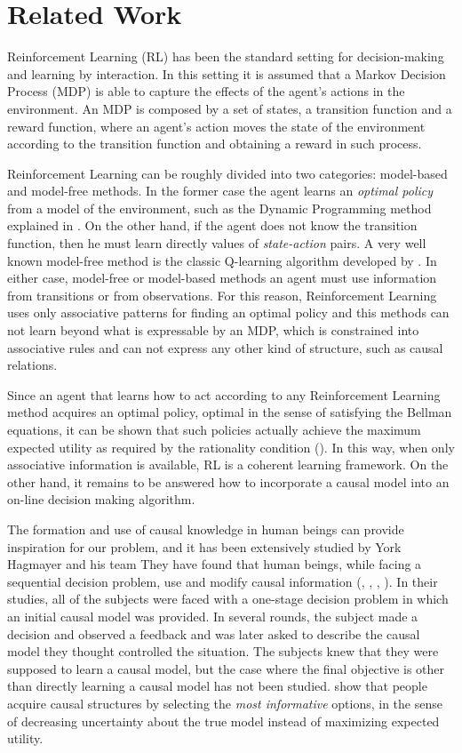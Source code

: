 \documentclass[english,letterpaper,12pt,final]{article}
\theoremstyle{definition}
\begin{document}
\section{Related Work}{\label{Related_Work}}
Reinforcement Learning (RL) has been the standard setting for decision-making and learning by interaction. In this setting it is assumed that a Markov Decision Process (MDP) is able to capture the effects of the agent's actions in the environment. An MDP is composed by a set of states, a transition function and a reward function, where an agent's action moves the state of the environment according to the transition function and obtaining a reward in such process.

Reinforcement Learning can be roughly divided into two categories: model-based and model-free methods. In the former case the agent learns an \textit{optimal policy} from a model of the environment, such as the Dynamic Programming method explained in \cite{sutton1998reinforcement}. On the other hand, if the agent does not know the transition function, then he must learn directly values of \textit{state-action} pairs. A very well known model-free method is the classic Q-learning algorithm developed by \cite{watkins1992q}. In either case, model-free or model-based methods an agent must use information from transitions or from observations. For this reason, Reinforcement Learning uses only associative patterns for finding an optimal policy and this methods can not learn beyond what is expressable by an MDP, which is constrained into associative rules and can not express any other kind of structure, such as causal relations. 

Since an agent that learns how to act according to any Reinforcement Learning method acquires an optimal policy, optimal in the sense of satisfying the Bellman equations, it can be shown that such policies actually achieve the maximum expected utility as required by the rationality condition (\cite{webb2007game}). In this way, when only associative information is available, RL is a coherent learning framework. On the other hand, it remains to be answered how to incorporate a causal model into an on-line decision making algorithm.

The formation and use of causal knowledge in human beings can provide inspiration for our problem, and it has been extensively studied by York Hagmayer and his team They have found that human beings, while facing a sequential decision problem, use and modify causal information (\cite{hagmayer2008causal}, \cite{hagmayer2009decision}, \cite{hagmayer2010spontaneous}, \cite{hagmayer2013repeated}). In their studies, all of the subjects were faced with a one-stage decision problem in which an initial causal model was provided. In several rounds, the subject made a decision and observed a feedback and was later asked to describe the causal model they thought controlled the situation. The subjects knew that they were supposed to learn a causal model, but the case where the final objective is other than directly learning a causal model has not been studied. \cite{bramley2015conservative} show that people acquire causal structures by selecting the \textit{most informative} options, in the sense of decreasing uncertainty about the true model instead of maximizing expected utility.
\end{document}
